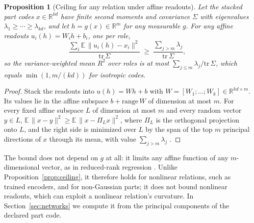 \documentclass[10pt]{article}
\theoremstyle{plain}
\newtheorem{proposition}{Proposition}
\theoremstyle{remark}
\newcommand{\R}{\mathbb{R}}
\begin{document}
\begin{proposition}[Ceiling for any relation under affine readouts]
\label{prop:ey}
Let the stacked part codes $x \in \R^{kd}$ have finite second moments and covariance $\Sigma$ with eigenvalues $\lambda_1 \ge \cdots \ge \lambda_{kd}$, and let $h = g(x) \in \R^m$ for any measurable $g$. For any affine readouts $u_i(h) = W_i h + b_i$, one per role,
\begin{equation}
  \frac{\sum_i \mathbb{E}\,\lVert u_i(h) - x_i \rVert^2}{\mathrm{tr}\,\Sigma} \;\ge\; \frac{\sum_{j > m} \lambda_j}{\mathrm{tr}\,\Sigma},
\end{equation}
so the variance-weighted mean $R^2$ over roles is at most $\sum_{j \le m} \lambda_j / \mathrm{tr}\,\Sigma$, which equals $\min(1, m/(kd))$ for isotropic codes.
\end{proposition}

\begin{proof}
Stack the readouts into $u(h) = Wh + b$ with $W = [W_1; \ldots; W_k] \in \R^{kd \times m}$. Its values lie in the affine subspace $b + \mathrm{range}\,W$ of dimension at most $m$. For every fixed affine subspace $L$ of dimension at most $m$ and every random vector $y \in L$, $\mathbb{E}\,\lVert x - y \rVert^2 \ge \mathbb{E}\,\lVert x - \Pi_L x \rVert^2$, where $\Pi_L$ is the orthogonal projection onto $L$, and the right side is minimized over $L$ by the span of the top $m$ principal directions of $x$ through its mean, with value $\sum_{j > m} \lambda_j$ \citep{eckart1936}.
\end{proof}

\noindent
The bound does not depend on $g$ at all: it limits any affine function of any $m$-dimensional vector, as in reduced-rank regression \citep{izenman1975}. Unlike Proposition~\ref{prop:ceiling}, it therefore holds for nonlinear relations, such as trained encoders, and for non-Gaussian parts; it does not bound nonlinear readouts, which can exploit a nonlinear relation's curvature. In Section~\ref{sec:networks} we compute it from the principal components of the declared part code.
\end{document}
